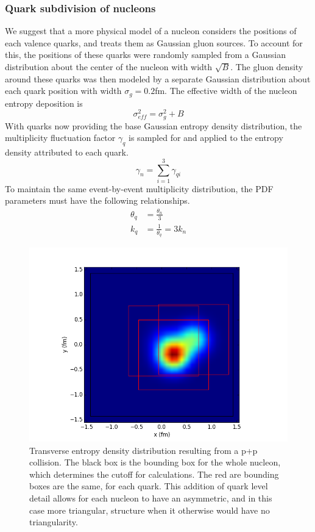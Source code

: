 \documentclass[preprint,showpacs,amsfonts,aps,prl,nofootinbib,floatfix]{revtex4}
\begin{document}
\subsubsection{Quark subdivision of nucleons}
\label{sec2b1}
We suggest that a more physical model of a nucleon considers the positions of each valence quarks, and treats them as Gaussian gluon sources. To account for this, the positions of these quarks were randomly sampled from a Gaussian distribution about the center of the nucleon with width $\sqrt{B}$. The gluon density around these quarks was then modeled by a separate Gaussian distribution about each quark position with width $\sigma_g=0.2$fm. The effective width of the nucleon entropy deposition is 
\begin{equation} 
	\label{eq:QuarkConstraint}
	\sigma_{eff}^2 = \sigma_g ^2+B
\end{equation}
With quarks now providing the base Gaussian entropy density distribution, the multiplicity fluctuation factor $\gamma_q$ is sampled for and applied to the entropy density attributed to each quark.
\begin{equation} 
	\gamma_n = \sum_{i=1}^{3} \gamma_{qi}
\end{equation}
To maintain the same event-by-event multiplicity distribution, the PDF parameters must have the following relationships.
\begin{align}
	\theta_q &= \frac{\theta_n}{3}\\
	k_q &= \frac{1}{\theta_q} = 3 k_n
\end{align}
\begin{figure}[hb] 
	\includegraphics[width = 0.8\linewidth]{figs/QuarkSubstructure.png}
	\caption{Transverse entropy density distribution resulting from a p+p collision. The black box is the bounding box for the whole nucleon, which determines the cutoff for calculations. The red are bounding boxes are the same, for each quark. This addition of quark level detail allows for each nucleon to have an asymmetric, and in this case more triangular, structure when it otherwise would have no triangularity.}
	\label{fig:QuarkSubstructure}
\end{figure}
\end{document}
